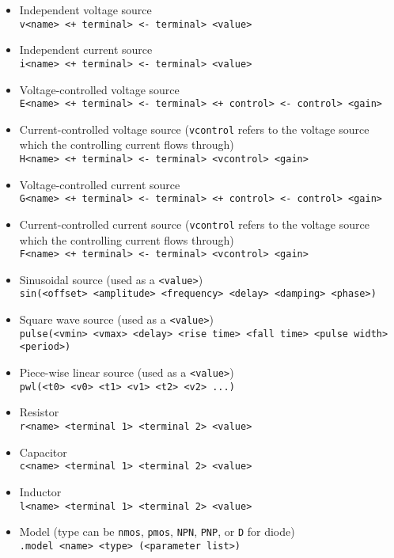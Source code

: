 \documentclass{article}
\begin{document}
\begin{itemize}
	\item Independent voltage source \\ \verb|v<name> <+ terminal> <- terminal> <value>|
	\item Independent current source \\ \verb|i<name> <+ terminal> <- terminal> <value>|
	\item Voltage-controlled voltage source \\ \verb|E<name> <+ terminal> <- terminal> <+ control> <- control> <gain>|
	\item Current-controlled voltage source (\verb|vcontrol| refers to the voltage source which the controlling current flows through) \\ \verb|H<name> <+ terminal> <- terminal> <vcontrol> <gain>|
	\item Voltage-controlled current source  \\ \verb|G<name> <+ terminal> <- terminal> <+ control> <- control> <gain>|
	\item Current-controlled current source (\verb|vcontrol| refers to the voltage source which the controlling current flows through) \\ \verb|F<name> <+ terminal> <- terminal> <vcontrol> <gain>|
	\item Sinusoidal source (used as a \verb|<value>|) \\ \verb|sin(<offset> <amplitude> <frequency> <delay> <damping> <phase>)|
	\item Square wave source (used as a \verb|<value>|) \\ \verb|pulse(<vmin> <vmax> <delay> <rise time> <fall time> <pulse width> <period>)|
	\item Piece-wise linear source (used as a \verb|<value>|) \\ \verb|pwl(<t0> <v0> <t1> <v1> <t2> <v2> ...)|
	\item Resistor \\ \verb|r<name> <terminal 1> <terminal 2> <value>|
	\item Capacitor \\ \verb|c<name> <terminal 1> <terminal 2> <value>|
	\item Inductor \\ \verb|l<name> <terminal 1> <terminal 2> <value>|
	\item Model (type can be \verb|nmos|, \verb|pmos|, \verb|NPN|, \verb|PNP|, or \verb|D| for diode) \\ \verb|.model <name> <type> (<parameter list>)|

\end{itemize}
\end{document}
